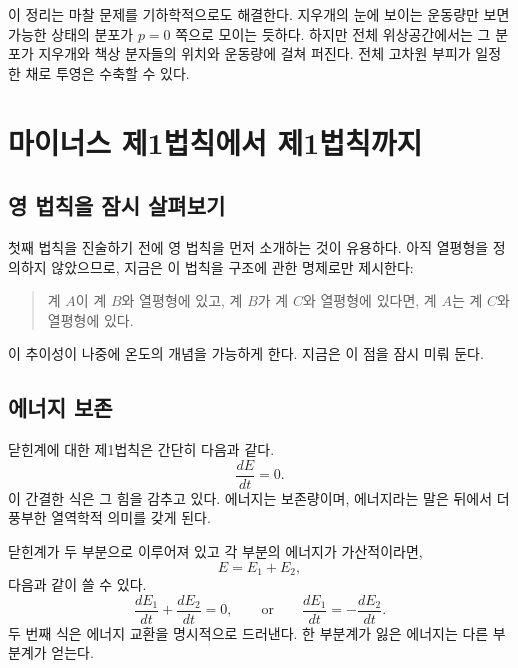 이 정리는 마찰 문제를 기하학적으로도 해결한다. 지우개의 눈에 보이는 운동량만 보면 가능한 상태의 분포가 \(p=0\) 쪽으로 모이는 듯하다. 하지만 전체 위상공간에서는 그 분포가 지우개와 책상 분자들의 위치와 운동량에 걸쳐 퍼진다. 전체 고차원 부피가 일정한 채로 투영은 수축할 수 있다.

\begin{classroomqa}
\end{classroomqa}

\section{마이너스 제1법칙에서 제1법칙까지}

\subsection{영 법칙을 잠시 살펴보기}

첫째 법칙을 진술하기 전에 영 법칙을 먼저 소개하는 것이 유용하다. 아직 열평형을 정의하지 않았으므로, 지금은 이 법칙을 구조에 관한 명제로만 제시한다:
\begin{quote}
계 \(A\)이 계 \(B\)와 열평형에 있고, 계 \(B\)가 계 \(C\)와 열평형에 있다면, 계 \(A\)는 계 \(C\)와 열평형에 있다.
\end{quote}
이 추이성이 나중에 온도의 개념을 가능하게 한다. 지금은 이 점을 잠시 미뤄 둔다.

\subsection{에너지 보존}

닫힌계에 대한 제1법칙은 간단히 다음과 같다.
\begin{equation}
 \frac{dE}{dt}=0.
 \label{eq:sm1-first-law}
\end{equation}
이 간결한 식은 그 힘을 감추고 있다. 에너지는 보존량이며, 에너지라는 말은 뒤에서 더 풍부한 열역학적 의미를 갖게 된다.

닫힌계가 두 부분으로 이루어져 있고 각 부분의 에너지가 가산적이라면,
\begin{equation}
 E=E_1+E_2,
\end{equation}
다음과 같이 쓸 수 있다.
\begin{equation}
 \frac{dE_1}{dt}+\frac{dE_2}{dt}=0,
 \qquad\text{or}\qquad
 \frac{dE_1}{dt}=-\frac{dE_2}{dt}.
 \label{eq:sm1-energy-exchange}
\end{equation}
두 번째 식은 에너지 교환을 명시적으로 드러낸다. 한 부분계가 잃은 에너지는 다른 부분계가 얻는다.


